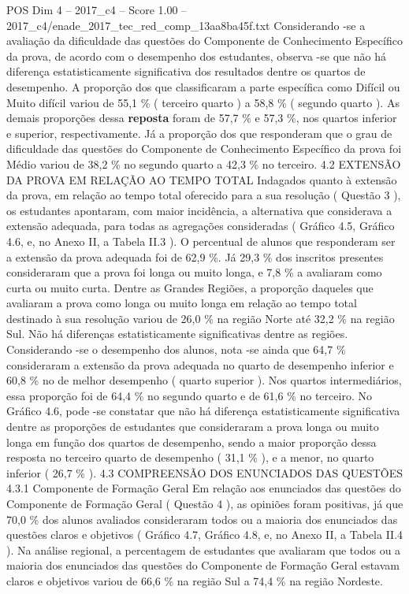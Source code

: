 \begin{textsample}{POS Dim 4 – 2017\_c4 – Score 1.00 – 2017\_c4/enade\_2017\_tec\_red\_comp\_13aa8ba45f.txt}
Considerando -se a avaliação da dificuldade das questões do Componente de Conhecimento Específico da prova, de acordo com o desempenho dos estudantes, observa -se que não há diferença estatisticamente significativa dos resultados dentre os quartos de desempenho.
A proporção dos que classificaram a parte específica como Difícil ou Muito difícil variou de 55,1 \% ( terceiro quarto ) a 58,8 \% ( segundo quarto ).
As demais proporções dessa \textbf{reposta} foram de 57,7 \% e 57,3 \%, nos quartos inferior e superior, respectivamente.
Já a proporção dos que responderam que o grau de dificuldade das questões do Componente de Conhecimento Específico da prova foi Médio variou de 38,2 \% no segundo quarto a 42,3 \% no terceiro. 4.2 EXTENSÃO DA PROVA EM RELAÇÃO AO TEMPO TOTAL Indagados quanto à extensão da prova, em relação ao tempo total oferecido para a sua resolução ( Questão 3 ), os estudantes apontaram, com maior incidência, a alternativa que considerava a extensão adequada, para todas as agregações consideradas ( Gráfico 4.5, Gráfico 4.6, e, no Anexo II, a Tabela II.3 ).
O percentual de alunos que responderam ser a extensão da prova adequada foi de 62,9 \%.
Já 29,3 \% dos inscritos presentes consideraram que a prova foi longa ou muito longa, e 7,8 \% a avaliaram como curta ou muito curta.
Dentre as Grandes Regiões, a proporção daqueles que avaliaram a prova como longa ou muito longa em relação ao tempo total destinado à sua resolução variou de 26,0 \% na região Norte até 32,2 \% na região Sul.
Não há diferenças estatisticamente significativas dentre as regiões.
Considerando -se o desempenho dos alunos, nota -se ainda que 64,7 \% consideraram a extensão da prova adequada no quarto de desempenho inferior e 60,8 \% no de melhor desempenho ( quarto superior ).
Nos quartos intermediários, essa proporção foi de 64,4 \% no segundo quarto e de 61,6 \% no terceiro.
No Gráfico 4.6, pode -se constatar que não há diferença estatisticamente significativa dentre as proporções de estudantes que consideraram a prova longa ou muito longa em função dos quartos de desempenho, sendo a maior proporção dessa resposta no terceiro quarto de desempenho ( 31,1 \% ), e a menor, no quarto inferior ( 26,7 \% ). 4.3 COMPREENSÃO DOS ENUNCIADOS DAS QUESTÕES 4.3.1 Componente de Formação Geral Em relação aos enunciados das questões do Componente de Formação Geral ( Questão 4 ), as opiniões foram positivas, já que 70,0 \% dos alunos avaliados consideraram todos ou a maioria dos enunciados das questões claros e objetivos ( Gráfico 4.7, Gráfico 4.8, e, no Anexo II, a Tabela II.4 ).
Na análise regional, a percentagem de estudantes que avaliaram que todos ou a maioria dos enunciados das questões do Componente de Formação Geral estavam claros e objetivos variou de 66,6 \% na região Sul a 74,4 \% na região Nordeste.

\end{textsample}
